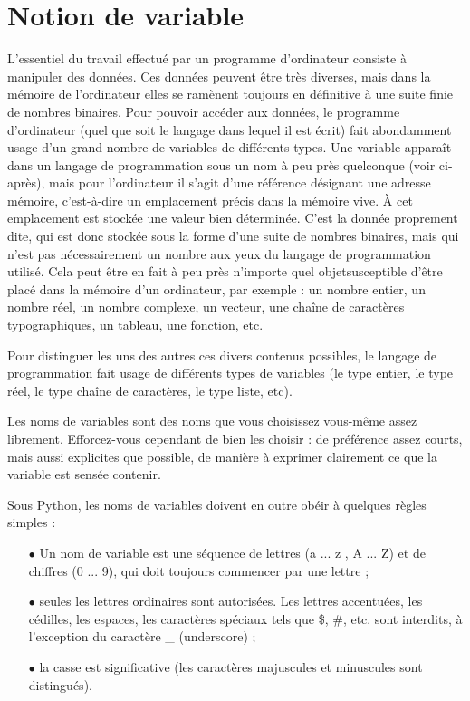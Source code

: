 \section{Notion de variable}
L'essentiel du travail effectué par un programme d'ordinateur consiste à  manipuler des données. Ces données peuvent être très diverses, mais dans la mémoire de l'ordinateur elles se ramènent toujours en définitive à  une suite finie de nombres binaires. Pour pouvoir accéder aux données, le programme d'ordinateur (quel que soit le langage dans lequel il est écrit) fait abondamment usage d'un grand nombre de variables de différents types. Une variable apparaît dans un langage de programmation sous un nom à  peu près quelconque (voir ci-après), mais pour l'ordinateur il s'agit d'une référence désignant une adresse mémoire, c'est-à-dire un emplacement précis dans la mémoire vive. À cet emplacement est stockée une valeur bien déterminée. C'est la donnée proprement dite, qui est donc stockée sous la forme d'une suite de nombres binaires, mais qui n'est pas nécessairement un nombre aux yeux du langage de programmation utilisé. Cela peut être en fait à  peu près n'importe quel \og objet\fg susceptible d'être placé dans la mémoire d'un ordinateur, par exemple : un nombre entier, un nombre réel, un nombre complexe, un vecteur, une chaîne de caractères typographiques, un tableau, une fonction, etc.\par
Pour distinguer les uns des autres ces divers contenus possibles, le langage de programmation fait usage de différents types de variables (le type entier, le type réel, le type chaîne de caractères, le type liste, etc). \par
Les noms de variables sont des noms que vous choisissez vous-même assez librement. Efforcez-vous cependant de bien les choisir : de préférence assez courts, mais aussi explicites que possible, de manière à exprimer clairement ce que la variable est sensée contenir.\par
Sous Python, les noms de variables doivent en outre obéir à quelques règles simples :
\begin{itemize}
	\item [$\bullet$] Un nom de variable est une séquence de lettres (a ... z , A ... Z) et de chiffres (0 ... 9), qui doit toujours commencer par une lettre ;
\item [$\bullet$] seules les lettres ordinaires sont autorisées. Les lettres accentuées, les cédilles, les espaces, les caractères spéciaux tels que \$, \#, etc. sont interdits, à l'exception du caractère \_ (underscore) ;
\item [$\bullet$] la casse est significative (les caractères majuscules et minuscules sont distingués).
\end{itemize}
